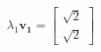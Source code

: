 \documentclass[preview]{standalone}
\begin{document}
\begin{align*}
\lambda_1 \mathbf{v_1} = \begin{bmatrix} \sqrt{2} \\ \sqrt{2} \end{bmatrix}
\end{align*}
\end{document}
